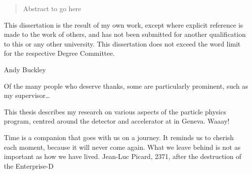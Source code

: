 
\begin{abstract}%
  Abstract to go here
\end{abstract}


\begin{declaration}
  This dissertation is the result of my own work, except where explicit
  reference is made to the work of others, and has not been submitted
  for another qualification to this or any other university. This
  dissertation does not exceed the word limit for the respective Degree
  Committee.
  \vspace*{1cm}
  \begin{flushright}
    Andy Buckley
  \end{flushright}
\end{declaration}


\begin{acknowledgements}
  Of the many people who deserve thanks, some are particularly prominent,
  such as my supervisor\dots
\end{acknowledgements}


\begin{preface}
  This thesis describes my research on various aspects of the \LHCb
  particle physics program, centred around the \LHCb detector and \LHC
  accelerator at \CERN in Geneva. Waaay!

  \noindent
\end{preface}

\tableofcontents

\frontquote%
  {Time is a companion that goes with us on a journey. It reminds us to cherish each moment, because it will never come again. What we leave behind is not as important as how we have lived.}%
  {Jean-Luc Picard, 2371, after the destruction of the Enterprise-D}
